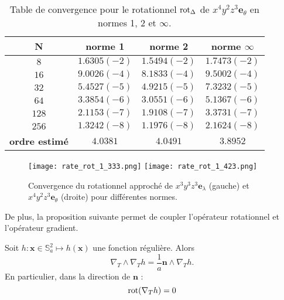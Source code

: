 \begin{table}[htbp]
\begin{center}
\begin{tabular}{|c||c|c|c|}
\hline
\textbf{N}  & \textbf{norme 1} & \textbf{norme 2} & \textbf{norme $\infty$} \\
\hline
\hline
$8$  & $1.6305(-2)$ & $1.5494(-2)$ & $1.7473(-2)$  \\
$16$ & $9.0026(-4)$ & $8.1833(-4)$ & $9.5002(-4)$  \\
$32$ & $5.4527(-5)$ & $4.9215(-5)$ & $7.3232(-5)$  \\
$64$ & $3.3854(-6)$ & $3.0551(-6)$ & $5.1367(-6)$  \\
$128$& $2.1153(-7)$ & $1.9108(-7)$ & $3.3731(-7)$  \\
$256$& $1.3242(-8)$ & $1.1976(-8)$ & $2.1624(-8)$  \\
\hline 
\hline
\textbf{ordre estimé}& $4.0381$ & $4.0491$ & $3.8952$\\
\hline
\end{tabular}
\end{center}
\caption{Table de convergence pour le rotationnel $\text{rot}_{\Delta}$ de $ x^4 y^2 z^3 \mathbf{e}_{\theta}$ en normes 1, 2 et $\infty$.}
\label{tab:rate_rot2}
\end{table} 

\begin{figure}[htbp]
\begin{center}
\texttt{[image: rate\_rot\_1\_333.png]}
\texttt{[image: rate\_rot\_1\_423.png]}
\end{center}
\caption{Convergence du rotationnel approché de $ x^3 y^3 z^3 \mathbf{e}_{\lambda}$ (gauche) et $ x^4 y^2 z^3 \mathbf{e}_{\theta}$ (droite) pour différentes normes.}
\label{fig:rate_rot}
\end{figure}

De plus, la proposition suivante permet de coupler l'opérateur rotationnel et l'opérateur gradient.

\begin{proposition}
Soit $h : \mathbf{x} \in \mathbb{S}_a^2 \mapsto h(\mathbf{x})$ une fonction régulière. Alors 
\begin{equation}
\nabla_T \wedge \nabla_T h = \dfrac{1}{a} \mathbf{n} \wedge \nabla_T h.
\end{equation}
En particulier, dans la direction de $\mathbf{n}$ :
\begin{equation}
\text{rot}(\nabla_T h) = 0
\end{equation}
\label{prop:vort_grad}
\end{proposition}

